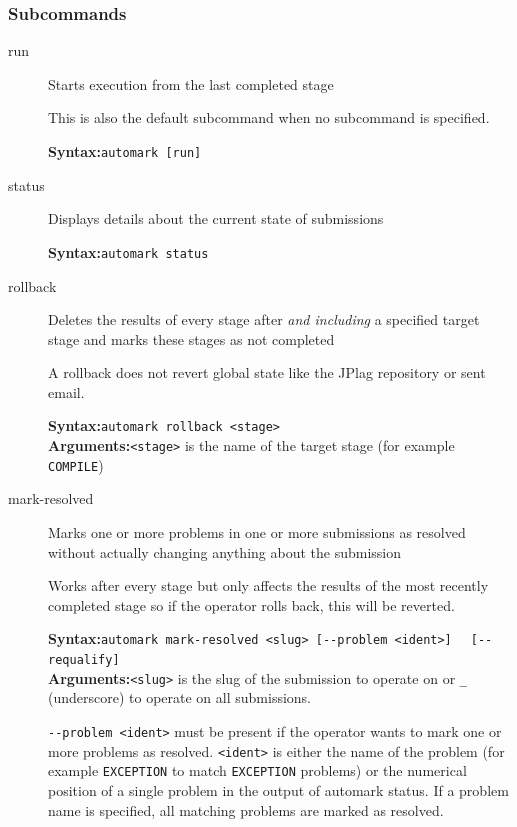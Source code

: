 \documentclass[12pt,a4paper,oneside]{report}
\begin{document}
	\subsubsection{Subcommands}
	\begin{description}
		\item[run] Starts execution from the last completed stage

		This is also the default subcommand when no subcommand is specified.

		\textbf{Syntax:}\tabto{75pt}\lstinline|automark [run]|

		\item[status] Displays details about the current state of submissions

		\textbf{Syntax:}\tabto{75pt}\lstinline|automark status|

		\item[rollback] Deletes the results of every stage after \emph{and including} a specified target stage and marks these stages as not completed

		A rollback does not revert global state like the JPlag repository or sent email.

		\textbf{Syntax:}\tabto{75pt}\lstinline|automark rollback <stage>|\\
		\textbf{Arguments:}\tabto{75pt}\lstinline|<stage>| is the name of the target stage (for example \lstinline|COMPILE|)
		\item[mark-resolved] Marks one or more problems in one or more submissions as resolved without actually changing anything about the submission

		Works after every stage but only affects the results of the most recently completed stage so if the operator rolls back, this will be reverted.

		\textbf{Syntax:}\tabto{75pt}\lstinline|automark mark-resolved <slug> [--problem <ident>]|
		\tabto{75pt}\lstinline|  [--requalify]|\\
		\textbf{Arguments:}\tabto{75pt}\lstinline|<slug>| is the slug of the submission to operate on or \lstinline|_| (underscore) to operate on all submissions.

		\lstinline|--problem <ident>| must be present if the operator wants to mark one or more problems as resolved. \lstinline|<ident>| is either the name of the problem (for example \lstinline|EXCEPTION| to match \lstinline|EXCEPTION| problems) or the numerical position of a single problem in the output of automark status. If a problem name is specified, all matching problems are marked as resolved.


\end{description}
\end{document}
